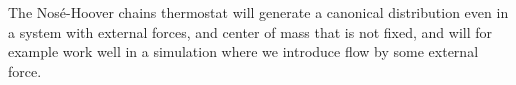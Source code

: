 The Nosé-Hoover chains thermostat will generate a canonical distribution even in a system with external forces, and center of mass that is not fixed\cite[Appendix B.2.2]{frenkel2001understanding}, and will for example work well in a simulation where we introduce flow by some external force.


% 
% 
% 

